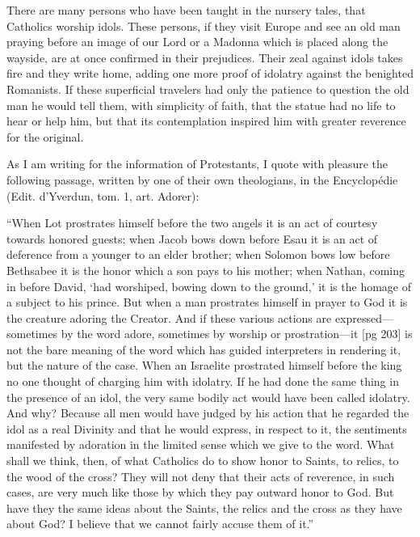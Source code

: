 There are many persons who have been taught
in the nursery tales, that Catholics worship idols.
These persons, if they visit Europe and see an
old man praying before an image of our Lord
or a Madonna which is placed along the wayside,
are at once confirmed in their prejudices. Their
zeal against idols takes fire and they write home,
adding one more proof of idolatry against the benighted
Romanists. If these superficial travelers
had only the patience to question the old man he
would tell them, with simplicity of faith, that
the statue had no life to hear or help him, but
that its contemplation inspired him with greater
reverence for the original.

As I am writing for the information of Protestants,
I quote with pleasure the following passage,
written by one of their own theologians, in the
Encyclopédie (Edit. d'Yverdun, tom. 1, art.
Adorer):

“When Lot prostrates himself before the two
angels it is an act of courtesy towards honored
guests; when Jacob bows down before Esau it is
an act of deference from a younger to an elder
brother; when Solomon bows low before Bethsabee
it is the honor which a son pays to his
mother; when Nathan, coming in before David,
‘had worshiped, bowing down to the ground,’ it
is the homage of a subject to his prince. But
when a man prostrates himself in prayer to God
it is the creature adoring the Creator. And if
these various actions are expressed—sometimes
by the word adore, sometimes
by worship or prostration—it
[pg 203]
is not the bare meaning of the word
which has guided interpreters in rendering it,
but the nature of the case. When an Israelite
prostrated himself before the king no one thought
of charging him with idolatry. If he had done
the same thing in the presence of an idol, the very
same bodily act would have been called idolatry.
And why? Because all men would have judged
by his action that he regarded the idol as a real
Divinity and that he would express, in respect to
it, the sentiments manifested by adoration in the
limited sense which we give to the word. What
shall we think, then, of what Catholics do to
show honor to Saints, to relics, to the wood of
the cross? They will not deny that their acts of
reverence, in such cases, are very much like those
by which they pay outward honor to God. But
have they the same ideas about the Saints, the
relics and the cross as they have about God? I
believe that we cannot fairly accuse them of it.”

